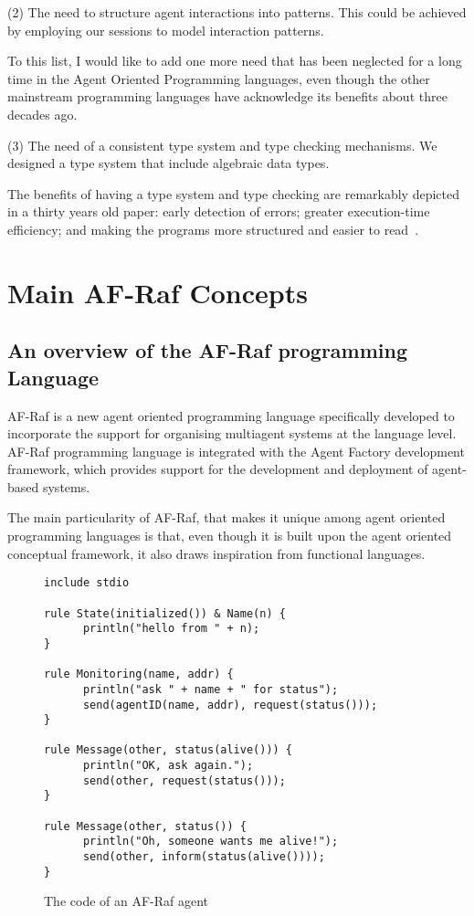 \documentclass[a4paper,12pt,oneside,fleqn]{book} %
\begin{document}
(2) The need to structure agent interactions into patterns. This could be
achieved by employing our sessions to model interaction patterns.

To this list, I would like to add one more need that has been neglected for
a long time in the Agent Oriented Programming languages, even though the
other mainstream programming languages have acknowledge its benefits about
three decades ago.

(3) The need of a consistent type system and type checking mechanisms. We
designed a type system that include algebraic data types.


The benefits of having a type system and type checking are remarkably
depicted in a thirty years old paper: early detection of
errors; greater execution-time efficiency; and making the programs more
structured and easier to read~\cite{DBLP:journals/csur/CardelliW85}.


\chapter{Main AF-Raf Concepts}\label{ch:concepts} %
\section{An overview of the AF-Raf programming Language} %

AF-Raf is a new agent oriented programming language specifically developed
to incorporate the support for organising multiagent systems at the
language level. AF-Raf programming language is integrated with the
Agent Factory development framework, which provides support for the
development and deployment of agent-based systems.

The main particularity of AF-Raf, that makes it unique among agent oriented
programming languages is that, even though it is built upon the agent
oriented conceptual framework, it also draws inspiration from functional
languages.

\begin{figure}\footnotesize %
\begin{verbatim}
include stdio

rule State(initialized()) & Name(n) {
      println("hello from " + n);
}

rule Monitoring(name, addr) {
      println("ask " + name + " for status");
      send(agentID(name, addr), request(status()));
}

rule Message(other, status(alive())) {
      println("OK, ask again.");
      send(other, request(status()));
}

rule Message(other, status()) {
      println("Oh, someone wants me alive!");
      send(other, inform(status(alive())));
}
\end{verbatim}
\caption{The code of an AF-Raf agent}
\label{fig:AF-Raf}
\end{figure} %
\end{document}
